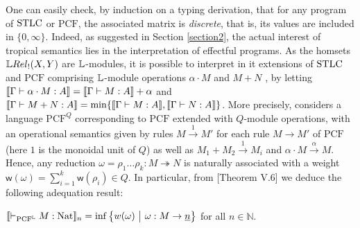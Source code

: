 One can easily check, by induction on a typing derivation, that for any program of $\mathrm{STLC}$ or $\mathrm{PCF}$, the associated matrix is \emph{discrete}, that is, its values are included in $\{0,\infty\}$. Indeed, as suggested in Section \ref{section2}, the actual interest of tropical semantics lies in the interpretation of effectful programs. 
%
As the homsets $\LREL_{!}(X,Y)$ are $\mathbb{L}$-modules, it is possible to interpret in it  extensions of $\mathrm{STLC}$ and $\mathrm{PCF}$ comprising $\mathbb{L}$-module operations $\alpha \cdot M$ and $M+N$ \cite{Manzo2013}, by 
letting $\llbracket\Gamma \vdash \alpha\cdot M:A\rrbracket=\llbracket\Gamma \vdash M:A\rrbracket+\alpha$ and 
$\llbracket\Gamma \vdash M+N:A\rrbracket=\min\{\llbracket\Gamma \vdash M:A\rrbracket,\llbracket\Gamma \vdash N:A\rrbracket\}$. 
More precisely, \cite{Manzo2013} considers a language $\mathrm{PCF}^{Q}$ corresponding to $\mathrm{PCF}$ extended with $Q$-module operations, with an operational semantics given by rules $M\stackrel{1}{\to}M'$ for each rule $M\to M'$ of $\mathrm{PCF}$ (here $1$ is the monoidal unit of $Q$) as well as 
$M_{1}+M_{2} \stackrel{1}{\to}M_{i}$ and $\alpha\cdot M \stackrel{\alpha}{\to} M $.
Hence, any reduction $\omega=\rho_{1}\dots \rho_{k}: M \twoheadrightarrow N$ is naturally associated with a weight $\mathsf w(\omega)=\sum_{i=1}^{k}\mathsf w(\rho_{i})\in Q$.
In particular, from [Theorem V.6]\cite{Manzo2013} we deduce the following adequation result:
\begin{proposition}
$\model{\vdash_{\mathrm{PCF}^{\Lawv}} M:\mathrm{Nat}}_{n}=  \inf\big\{ \mathsf w(\omega) \ \big \vert \ \omega : M \to \underline n\big \}$ for all $n\in \mathbb N$.
\end{proposition}

